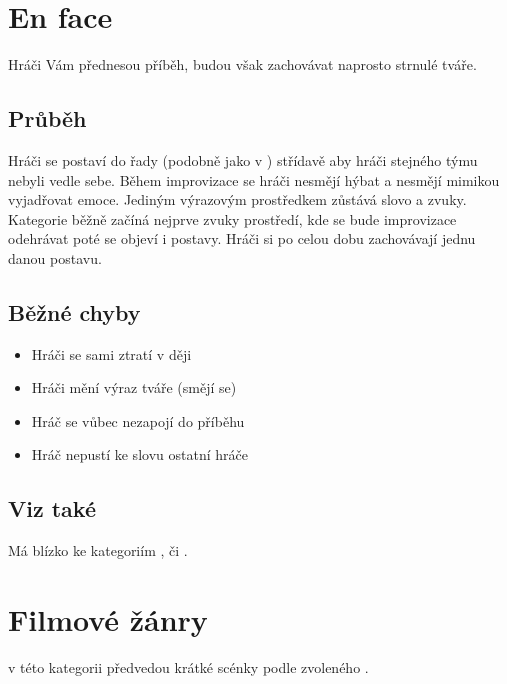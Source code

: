 
 
 
\needspace{5cm} \section{En face} \label{en face}  
 
Hráči Vám přednesou příběh, budou však zachovávat naprosto strnulé tváře. 
 
\subsection{ Průběh } Hráči se postaví do řady (podobně jako v ) střídavě aby hráči stejného týmu nebyli vedle sebe. Během improvizace se hráči nesmějí hýbat a nesmějí mimikou vyjadřovat emoce. Jediným výrazovým prostředkem zůstává slovo a zvuky. Kategorie běžně začíná nejprve zvuky prostředí, kde se bude improvizace odehrávat poté se objeví i postavy. Hráči si po celou dobu zachovávají jednu danou postavu. 
 
\subsection{ Běžné chyby } \begin{itemize}
\item  Hráči se sami ztratí v ději
\item  Hráči mění výraz tváře (smějí se)
\item  Hráč se vůbec nezapojí do příběhu
\item  Hráč nepustí ke slovu ostatní hráče
\end{itemize}
 
\subsection{ Viz také } Má blízko ke kategoriím ,  či . 
 
 
 
 
\needspace{5cm} \section{Filmové žánry} \label{filmové žánry}  
 
 
 v této kategorii předvedou krátké scénky podle zvoleného . 
 
